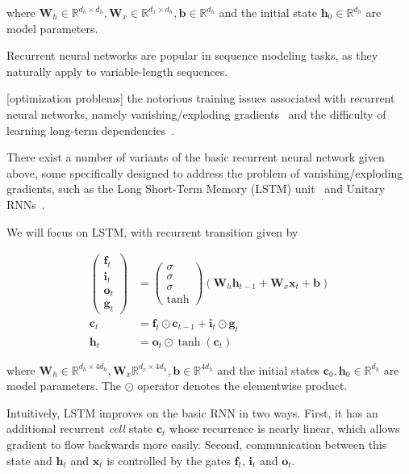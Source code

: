 \documentclass{article} %
\newcommand{\vect}[1]{\mathbf{#1}}
\newcommand{\mat}[1]{\mathbf{#1}}
\newcommand{\ewprod}{\odot}
\newcommand{\reals}{\mathbb{R}}
\begin{document}
where $\mat{W}_h \in \reals^{d_h \times d_h},
       \mat{W}_x \in \reals^{d_x \times d_h},
       \vect{b} \in \reals^{d_h}$
  and the initial state $\vect{h}_0 \in \reals^{d_h}$
  are model parameters.

Recurrent neural networks are popular in sequence modeling tasks, as they naturally apply to variable-length sequences.

[optimization problems]
 the notorious training issues associated with recurrent neural networks, namely vanishing/exploding gradients~\cite{somebody} and the difficulty of learning long-term dependencies~\cite{somebody else}.

There exist a number of variants of the basic recurrent neural network given above, some specifically designed to address the problem of vanishing/exploding gradients, such as the Long Short-Term Memory (LSTM) unit~\cite{lstm} and Unitary RNNs~\cite{urnn}.

We will focus on LSTM, with recurrent transition given by

\begin{align}
\left(\begin{array}{ccc}
\vect{f}_t \\
\vect{i}_t \\
\vect{o}_t \\
\vect{g}_t
\end{array}\right)
 &=
\left(\begin{array}{ccc}
\sigma \\
\sigma \\
\sigma \\
\tanh
\end{array}\right)
\left(
 \mat{W}_h \vect{h}_{t-1} +
 \mat{W}_x \vect{x}_t +
 \vect{b}
\right) \\
\vect{c}_t &= \vect{f}_t \ewprod \vect{c}_{t-1} +
              \vect{i}_t \ewprod \vect{g}_t \\
\vect{h}_t &= \vect{o}_t \ewprod \tanh(\vect{c}_t)
\end{align}

where $\vect{W}_h \in \reals^{d_h \times 4 d_h}, \vect{W}_x \reals^{d_x \times 4 d_h}, \vect{b} \in \reals^{4 d_h}$ and the initial states $\vect{c}_0, \vect{h}_0 \in \reals^{d_h}$ are model parameters.
The $\ewprod$ operator denotes the elementwise product.

Intuitively, LSTM improves on the basic RNN in two ways.
First, it has an additional recurrent \emph{cell} state $\vect{c}_t$ whose recurrence is nearly linear, which allows gradient to flow backwards more easily.
Second, communication between this state and $\vect{h}_t$ and $\vect{x}_t$ is controlled by the gates $\vect{f}_t$, $\vect{i}_t$ and $\vect{o}_t$.
\end{document}
